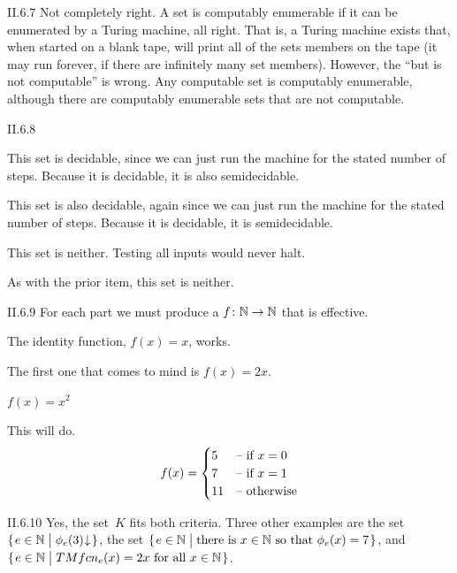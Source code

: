 %
\begin{ans}{II.6.7}
Not completely right.
A set is computably enumerable if it can be enumerated by a Turing machine, all
right.
That is, a Turing machine exists that, when started on a blank tape, will
print all of the sets members on the tape (it may run forever, if there are
infinitely many set members).
However, the ``but is not computable'' is wrong.
Any computable set is computably enumerable, although there are
computably enumerable sets that are not computable.
\end{ans}
%
\begin{ans}{II.6.8}
\begin{exparts}
\item
This set is decidable, since we can just run the machine for the stated number
of steps.
Because it is decidable, it is also semidecidable.
\item
This set is also decidable, again since we can just run the machine
for the stated number of steps.
Because it is decidable, it is semidecidable.
\item
This set is neither.
Testing all inputs would never halt.
\item
As with the prior item, this set is neither.
\end{exparts}
\end{ans}
%
\begin{ans}{II.6.9}
For each part we must produce a $\mbox{$f\colon \mathbb{N}\to \mathbb{N}$}$ that is effective.
\begin{exparts}
\item The identity function, $f(x)=x$, works.
\item The first one that comes to mind is $f(x)=2x$.
\item $f(x)=x^2$
\item This will do.
\begin{equation*}
   f(x)=
   \begin{cases}
     5  &\text{-- if $x=0$}  \\
     7  &\text{-- if $x=1$}  \\
    11  &\text{-- otherwise}
   \end{cases}
\end{equation*}
\end{exparts}
\end{ans}
%
\begin{ans}{II.6.10}
Yes, the set~$K$ fits both criteria.
Three other examples are the set
$\set{e\in\N\suchthat \TMfcn_e(3)\converges}$,
the set
$\set{e\in\N\suchthat \text{there is $x\in\N$ so that $\TMfcn_e(x)=7$}}$,
and $\set{e\in\N\suchthat\text{$TMfcn_e(x)=2x$ for all $x\in\N$}}$.
\end{ans}
